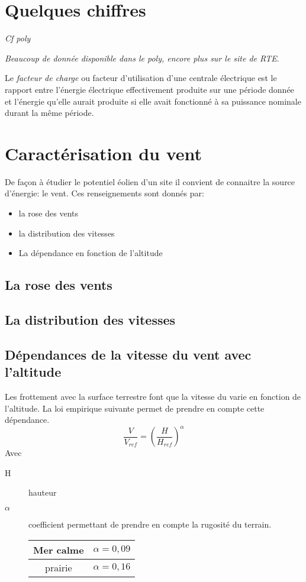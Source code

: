 \documentclass[main.tex]{subfiles}
\begin{document}
\section{Quelques chiffres}
\emph{Cf poly}

\emph{Beaucoup de donnée disponible dans le poly, encore plus sur le site de RTE}.
\begin{defin}
  Le \emph{facteur de charge} ou facteur d'utilisation d'une centrale électrique est le rapport entre l'énergie électrique effectivement produite sur une période donnée et l'énergie qu'elle aurait produite si elle avait fonctionné à sa puissance nominale durant la même période.
\end{defin}

\section{Caractérisation du vent}
De façon à étudier le potentiel éolien d'un site il convient de connaitre la source d'énergie: le vent. Ces renseignements sont donnés par:
\begin{itemize}
\item la rose des vents
\item la distribution des vitesses
\item La dépendance en fonction de l'altitude
\end{itemize}
\subsection{La rose des vents}
\subsection{La distribution des vitesses}
\subsection{Dépendances de la vitesse du vent avec l'altitude}
Les frottement avec la surface terrestre font que la vitesse du varie en fonction de l'altitude. La loi empirique suivante permet de prendre en compte cette dépendance.
\[
  \frac{V}{V_{ref}}= \left(\frac{H}{H_{ref}}\right)^\alpha
\]
Avec
\begin{description}
\item[H] hauteur
\item[$\alpha$] coefficient permettant de prendre en compte la rugosité du terrain.
  \begin{center}
    \begin{tabular}[H]{|c|c|}
      \hline
      Mer calme  & $\alpha = 0,09$ \\
      \hline
      prairie & $\alpha = 0,16$\\
      \hline
  \end{tabular}
\end{center}
\end{description}
\end{document}
